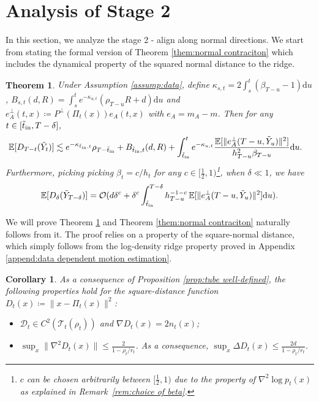 \documentclass[11pt]{article}
\newcommand{\mb}{\mathbb}
\newcommand{\dee}{\mathrm{d}}
\newcommand{\mc}{\mathcal}
\newtheorem{theorem}{Theorem}[section]
\newtheorem{corollary}{Corollary}[section]
\begin{document}
\section{Analysis of Stage 2}\label{append:stage 2} In this section, we analyze the stage 2 - align along normal directions. We start from stating the formal version of Theorem \ref{them:normal contraciton} which includes the dynamical property of the squared normal distance to the ridge.
\begin{theorem}\label{thm: formal normal contraciton} Under Assumption \ref{assump:data}, define $\kappa_{s,t}=2\int_s^t (\beta_{T-u}-1)\dee u$, $B_{s,t}(d,R)=\int_{s}^t e^{-\kappa_{u,t} } ( \rho_{T-u}R + d ) \dee u$ and $e_A^\perp(t,x)\coloneqq P^\perp(\Pi_t(x))e_A(t,x)$ with $e_A=m_A-m$. Then for any $t\in [\Tilde{t}_{\mathrm{in}},T-\delta]$,
{
    \begin{align*}
    \mb{E}[D_{T-t}(\Tilde{Y}_t)] &\lesssim e^{-\kappa_{\Tilde{t}_{\mathrm{in}},t} }\rho_{T-\Tilde{t}_{\mathrm{in}}}  + B_{\Tilde{t}_{\mathrm{in}},t}(d,R)  + \int_{\Tilde{t}_{\mathrm{in}}}^t e^{-\kappa_{u,t} } \frac{\mb{E}[\| e_A^\perp(T-u,\Tilde{Y}_u)\|^2]}{h_{T-u}^2\beta_{T-u}} \dee u. 
    \end{align*}}
    Furthermore, picking picking $\beta_t=c/h_t$ for any $c\in [\frac{1}{2},1)$\footnote{$c$ can be chosen arbitrarily between $[\tfrac{1}{2},1)$ due to the property of $\nabla^2\log p_t(x)$ as explained in Remark~\ref{rem:choice of beta}. }, when $\delta\ll 1$, we have
    {
\begin{align*}
    \mb{E}[D_{\delta}(\Tilde{Y}_{T-\delta})] = \mc{O}(d\delta^c+ \delta^c\int_{\Tilde{t}_{\mathrm{in}}}^{T-\delta}  h_{T-u}^{-1-c}\,{\mb{E}[\| e_A^\perp(T-u,\Tilde{Y}_u)\|^2]} \dee u  ).
\end{align*}}
\end{theorem}
We will prove Theorem \ref{thm: formal normal contraciton} and Theorem \ref{them:normal contraciton} naturally follows from it. The proof relies on a property of the square-normal distance, which simply follows from the log-density ridge property proved in Appendix \ref{append:data dependent motion estimation}. 
\begin{corollary}\label{cor:distance} As a consequence of Proposition \ref{prop:tube well-defined}, the following properties hold for the square-distance function $D_t(x)\coloneqq \| x-\Pi_t(x) \|^2$:
    \begin{itemize}
        \item [(1)] $\mc{D}_t\in C^2(\mc{T}_t(\rho_t))$ and $\nabla D_t(x)=2n_t(x)$;
        \item [(2)] $\sup_x \| \nabla^2 D_t(x) \|\le \tfrac{2}{1-\rho_t/r_t}$. As a consequence, $\sup_x \Delta D_t(x)\le \tfrac{2d}{1-\rho_t/r_t}$.
    \end{itemize}
\end{corollary}
\end{document}
